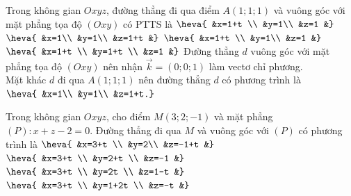 \begin{ex}%
	Trong không gian $Oxyz$, đường thẳng đi qua điểm $A(1; 1; 1)$ và vuông góc với mặt phẳng tọa độ $(Oxy)$ có PTTS là
	\choice
	{$\heva{	&x=1+t \\
			&y=1\\
			&z=1	&}$}
	{\True $\heva{	&x=1\\
			&y=1\\
			&z=1+t
			&}$}
	{$\heva{	&x=1+t \\
			&y=1\\
			&z=1	&}$}
	{$\heva{	&x=1+t \\
			&y=1+t \\
			&z=1	&}$}
	\loigiai
		{Đường thẳng $d$ vuông góc với mặt phẳng tọa độ $(Oxy)$ nên nhận $\overrightarrow{k}=(0; 0; 1)$ làm vectơ  chỉ phương.\\
		Mặt khác $d$ đi qua $A(1; 1; 1)$ nên đường thẳng $d$ có phương trình là $\heva{	&x=1\\
			&y=1\\
			&z=1+t.}$
		}
\end{ex}
\begin{ex}%
	Trong không gian $Oxyz$, cho điểm $M(3; 2;-1)$ và mặt phẳng $(P)\colon x+z-2=0$. Đường thẳng đi qua $M$ và vuông góc với $(P)$ có phương trình là
	\choice
	{\True $\heva{	&x=3+t \\
			&y=2\\
			&z=-1+t
			&}$}
	{$\heva{	&x=3+t \\
			&y=2+t \\
			&z=-1	&}$}
	{$\heva{	&x=3+t \\
			&y=2t \\
			&z=1-t
			&}$}
	{$\heva{	&x=3+t \\
			&y=1+2t \\
			&z=-t
			&}$}
\end{ex}
